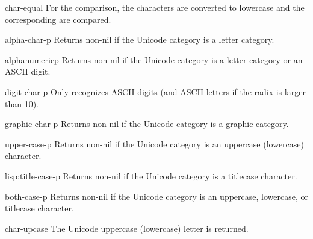 \begin{defun}{}{char-equal}{\amprest{} }
   For the comparison, the characters are converted to lowercase and
   the corresponding  are compared.
\end{defun}

\begin{defun}{}{alpha-char-p}{\args {}}
  Returns non-nil{} if the Unicode category is a letter category.
\end{defun}

\begin{defun}{}{alphanumericp}{\args {}}
  Returns non-nil{} if the Unicode category is a letter category or an ASCII
  digit.
\end{defun}

\begin{defun}{}{digit-char-p}{\args {} \ampoptional{} }
   Only recognizes ASCII digits (and ASCII letters if the radix is larger
   than 10).
\end{defun}

\begin{defun}{}{graphic-char-p}{\args {}}
  Returns non-nil{} if the Unicode category is a graphic category.
\end{defun}

\begin{defun}{}{upper-case-p}{\args {}}
  Returns non-nil{} if the Unicode category is an uppercase
  (lowercase) character.
\end{defun}

\begin{defun}{lisp:}{title-case-p}{\args {}}
  Returns non-nil{} if the Unicode category is a titlecase character.
\end{defun}

\begin{defun}{}{both-case-p}{\args {}}
  Returns non-nil{} if the Unicode category is an uppercase,
  lowercase, or titlecase character.
\end{defun}

\begin{defun}{}{char-upcase}{\args {}}
  The Unicode uppercase (lowercase) letter is returned.
\end{defun}

